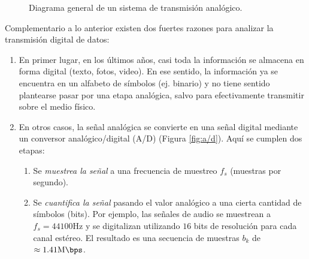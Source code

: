 \begin{figure}
    \begin{center}
        \caption{Diagrama general de un sistema de transmisión analógico.}\label{fig:analogico}
    \end{center}
\end{figure}

Complementario a lo anterior existen dos fuertes razones para analizar la transmisión digital de datos:
\begin{enumerate}
    \item En primer lugar, en los últimos años, casi toda la información se almacena en forma digital (texto, fotos, video). En ese sentido, la información ya se encuentra en un alfabeto de símbolos (ej. binario) y no tiene sentido plantearse pasar por una etapa analógica, salvo para efectivamente transmitir sobre el medio físico.
    
    \item En otros casos, la señal analógica se convierte en una señal digital mediante un conversor analógico/digital (A/D) (Figura \ref{fig:a/d}). Aquí se cumplen dos etapas:
     \begin{enumerate}
        \item Se \emph{muestrea la señal} a una frecuencia de muestreo $f_s$ (muestras por segundo).
        \item Se \emph{cuantifica la señal} pasando el valor analógico a una cierta cantidad de símbolos (bits). Por ejemplo, las señales de audio se muestrean a $f_s=44100 \unit{\hertz}$ y se digitalizan utilizando $16$ bits de resolución para cada canal estéreo. El resultado es una secuencia de muestras $b_k$ de $\approx 1.41 \unit{\mega\bps}$.
     \end{enumerate}
\end{enumerate}


